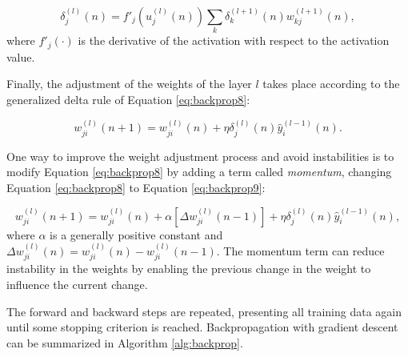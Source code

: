 \begin{equation}
    \label{eq:backprop7}
    \delta_j^{(l)} (n) = {f}'_j (u_j^{(l)}(n)) \sum_k \delta_k^{(l+1)} (n) w_{kj}^{(l+1)}(n),
\end{equation}
where ${f}'_j(\cdot)$ is the derivative of the activation with respect to the activation value.

Finally, the adjustment of the weights of the layer $l$ takes place according to the generalized delta rule of Equation \ref{eq:backprop8}:

\begin{equation}
    \label{eq:backprop8}
    w_{ji}^{(l)} (n+1) = w_{ji}^{(l)}(n) + \eta \delta_j^{(l)}(n) \hat{y}_i^{(l-1)} (n).
\end{equation}

One way to improve the weight adjustment process and avoid instabilities is to modify Equation \ref{eq:backprop8} by adding a term called \textit{momentum}, changing Equation \ref{eq:backprop8} to Equation \ref{eq:backprop9}:

\begin{equation}
\label{eq:backprop9}
    w_{ji}^{(l)} (n+1) = w_{ji}^{(l)}(n) + \alpha[\Delta w_{ji}^{(l)}(n-1)] + \eta \delta_j^{(l)}(n) \hat{y}_i^{(l-1)} (n),
\end{equation}
where $\alpha$ is a generally positive constant and $\Delta w_{ji}^{(l)}(n) = w_{ji}^{(l)}(n) - w_{ji}^{(l)}(n-1)$. The momentum term can reduce instability in the weights by enabling the previous change in the weight to influence the current change.

The forward and backward steps are repeated, presenting all training data again until some stopping criterion is reached. Backpropagation with gradient descent can be summarized in Algorithm \ref{alg:backprop}.


